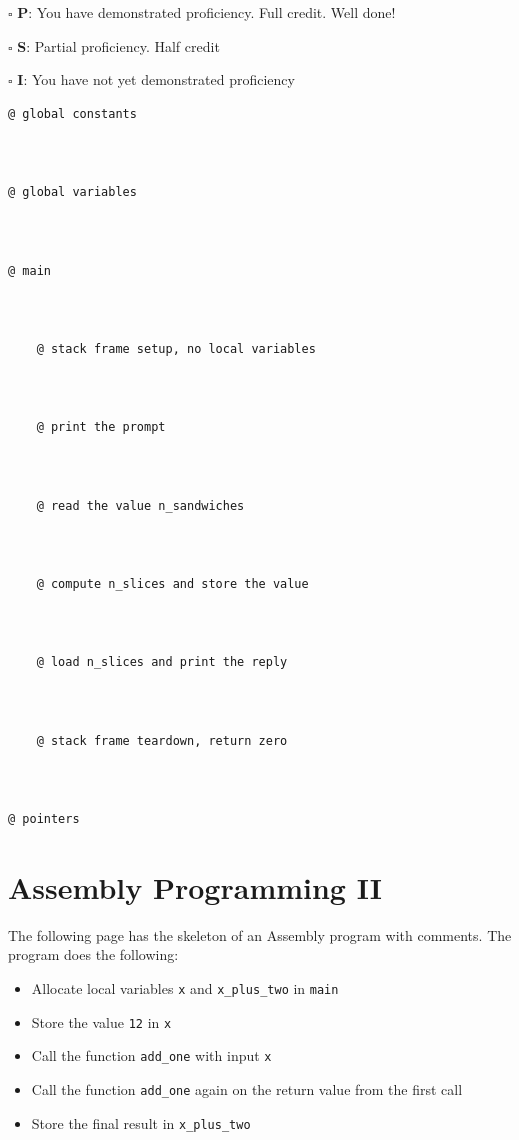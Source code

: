 \documentclass[12pt]{article}
\begin{document}
$\square$ \textbf{P}: You have demonstrated proficiency. Full credit. Well done!

$\square$ \textbf{S}: Partial proficiency. Half credit

$\square$ \textbf{I}: You have not yet demonstrated proficiency

\newpage

\begin{verbatim}
@ global constants



@ global variables



@ main


    
    @ stack frame setup, no local variables



    @ print the prompt



    @ read the value n_sandwiches



    @ compute n_slices and store the value



    @ load n_slices and print the reply



    @ stack frame teardown, return zero



@ pointers
\end{verbatim}



\section*{Assembly Programming II}

The following page has the skeleton of an Assembly program with comments. The program does the following:
\begin{itemize}
    \item Allocate local variables \texttt{x} and \texttt{x\_plus\_two} in \texttt{main}
    \item Store the value \texttt{12} in \texttt{x}
    \item Call the function \texttt{add\_one} with input \texttt{x}
    \item Call the function \texttt{add\_one} again on the return value from the first call
    \item Store the final result in \texttt{x\_plus\_two}
\end{itemize}
\end{document}
